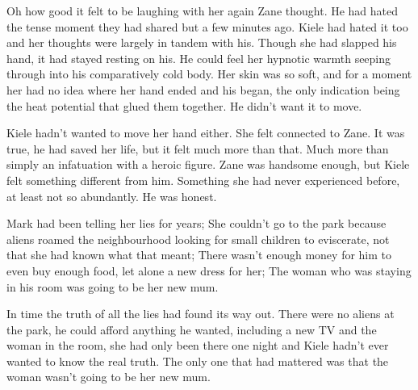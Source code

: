 Oh how good it felt to be laughing with her again Zane thought.  He had hated the tense moment they had shared but a few minutes ago.   Kiele had hated it too and her thoughts were largely in tandem with his.  Though she had slapped his hand, it had stayed resting on his.  He could feel her hypnotic warmth seeping through into his comparatively cold body.  Her skin was so soft, and for a moment her had no idea where her hand ended and his began, the only indication being the heat potential that glued them together.  He didn't want it to move.

Kiele hadn't wanted to move her hand either.  She felt connected to Zane.  It was true, he had saved her life, but it felt much more than that.  Much more than simply an infatuation with a heroic figure.  Zane was handsome enough, but Kiele felt something different from him.  Something she had never experienced before, at least not so abundantly.  He was honest.  

Mark had been telling her lies for years; She couldn't go to the park because aliens roamed the neighbourhood looking for small children to eviscerate, not that she had known what that meant; There wasn't enough money for him to even buy enough food, let alone a new dress for her; The woman who was staying in his room was going to be her new mum.  

In time the truth of all the lies had found its way out.  There were no aliens at the park, he could afford anything he wanted, including a new TV and the woman in the room, she had only been there one night and Kiele hadn't ever wanted to know the real truth.  The only one that had mattered was that the woman wasn't going to be her new mum.



